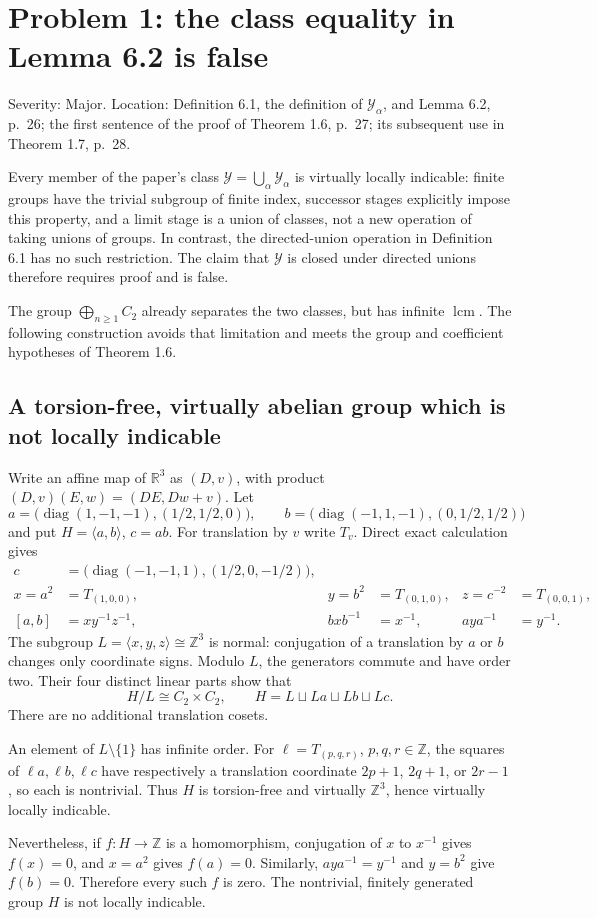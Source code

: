 \documentclass[10pt]{article}
\begin{document}
\section*{Problem 1: the class equality in Lemma 6.2 is false}
Severity: Major. Location: Definition 6.1, the definition of \(\mathcal Y_\alpha\), and Lemma 6.2, p. 26; the first sentence of the proof of Theorem 1.6, p. 27; its subsequent use in Theorem 1.7, p. 28.\par
Every member of the paper’s class \(\mathcal Y=\bigcup_\alpha\mathcal Y_\alpha\) is virtually locally indicable: finite groups have the trivial subgroup of finite index, successor stages explicitly impose this property, and a limit stage is a union of classes, not a new operation of taking unions of groups. In contrast, the directed-union operation in Definition 6.1 has no such restriction. The claim that \(\mathcal Y\) is closed under directed unions therefore requires proof and is false.\par
The group \(\bigoplus_{n\geq1}C_2\) already separates the two classes, but has infinite \(\operatorname{lcm}\). The following construction avoids that limitation and meets the group and coefficient hypotheses of Theorem 1.6.\par
\subsection*{A torsion-free, virtually abelian group which is not locally indicable}
Write an affine map of \(\mathbb R^3\) as \((D,v)\), with product \((D,v)(E,w)=(DE,Dw+v)\). Let \[a=\bigl(\operatorname{diag}(1,-1,-1),(1/2,1/2,0)\bigr),\qquad
 b=\bigl(\operatorname{diag}(-1,1,-1),(0,1/2,1/2)\bigr)\] and put \(H=\langle a,b\rangle\), \(c=ab\). For translation by \(v\) write \(T_v\). Direct exact calculation gives \[\begin{aligned}
 c&=\bigl(\operatorname{diag}(-1,-1,1),(1/2,0,-1/2)\bigr),\\
 x=a^2&=T_{(1,0,0)},&
 y=b^2&=T_{(0,1,0)},&
 z=c^{-2}&=T_{(0,0,1)},\\
 [a,b]&=xy^{-1}z^{-1},&
 bxb^{-1}&=x^{-1},&
 aya^{-1}&=y^{-1}.\end{aligned}\] The subgroup \(L=\langle x,y,z\rangle\cong\mathbb Z^3\) is normal: conjugation of a translation by \(a\) or \(b\) changes only coordinate signs. Modulo \(L\), the generators commute and have order two. Their four distinct linear parts show that \[H/L\cong C_2\times C_2,\qquad H=L\sqcup La\sqcup Lb\sqcup Lc.\] There are no additional translation cosets.\par
An element of \(L\setminus\{1\}\) has infinite order. For \(\ell=T_{(p,q,r)}\), \(p,q,r\in\mathbb Z\), the squares of \(\ell a,\ell b,\ell c\) have respectively a translation coordinate \(2p+1\), \(2q+1\), or \(2r-1\), so each is nontrivial. Thus \(H\) is torsion-free and virtually \(\mathbb Z^3\), hence virtually locally indicable.\par
Nevertheless, if \(f:H\to\mathbb Z\) is a homomorphism, conjugation of \(x\) to \(x^{-1}\) gives \(f(x)=0\), and \(x=a^2\) gives \(f(a)=0\). Similarly, \(aya^{-1}=y^{-1}\) and \(y=b^2\) give \(f(b)=0\). Therefore every such \(f\) is zero. The nontrivial, finitely generated group \(H\) is not locally indicable.\par
\end{document}
